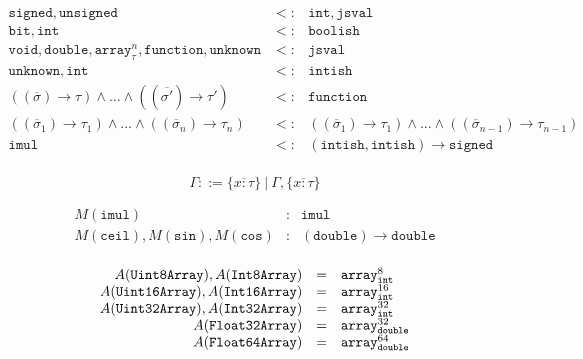 \documentclass{article}
\newcommand{\funty}[2]{({#1}) \rightarrow {#2}}
\newcommand{\seq}[1]{\overline{{#1}}}
\newcommand{\mathjssm}[1]{\mbox{\texttt{\scriptsize {#1}}}}
\newcommand{\bit}{\mathtt{bit}}
\newcommand{\unsigned}{\mathtt{unsigned}}
\newcommand{\intsm}{\mathjssm{int}}
\newcommand{\doublesm}{\mathjssm{double}}
\newcommand{\signed}{\mathtt{signed}}
\newcommand{\double}{\mathtt{double}}
\newcommand{\arr}[2]{\mathtt{array}^{#1}_{#2}}
\newcommand{\jsval}{\mathtt{jsval}}
\newcommand{\unk}{\mathtt{unknown}}
\newcommand{\void}{\mathtt{void}}
\renewcommand{\int}{\mathtt{int}}
\newcommand{\function}{\mathtt{function}}
\newcommand{\boolish}{\mathtt{boolish}}
\newcommand{\imul}{\mathtt{imul}}
\newcommand{\intish}{\mathtt{intish}}
\begin{document}

\[
\begin{array}{rcl}
\signed, \unsigned                                                                  & <: & \int, \jsval \\
\bit, \int                                                                          & <: & \boolish \\
\void, \double, \arr{n}{\tau}, \function, \unk                                      & <: & \jsval \\
\unk, \int                                                                          & <: & \intish \\
(\funty{\seq{\sigma}}{\tau}) \land \ldots \land (\funty{\seq{\sigma'}}{\tau'})      & <: & \function \\
(\funty{\seq{\sigma}_1}{\tau_1}) \land \ldots \land (\funty{\seq{\sigma}_n}{\tau_n}) & <: & (\funty{\seq{\sigma}_1}{\tau_1}) \land \ldots \land (\funty{\seq{\sigma}_{n-1}}{\tau_{n-1}}) \\
\imul                                                                               & <: & \funty{\intish, \intish}{\signed} \\
\end{array}
\]

\[
\Gamma ::= \{ \seq{x : \tau} \} ~|~ \Gamma, \{ \seq{x : \tau} \}
\]

\[
\begin{array}{rcl}
M(\imul) & : & \imul \\
M(\mathtt{ceil}), M(\mathtt{sin}), M(\mathtt{cos}) & : & \funty{\double}{\double} \\
\end{array}
\]

\[
\begin{array}{rcl}
A(\mathtt{Uint8Array}), A(\mathtt{Int8Array})   & = & \arr{8}{\intsm} \\
A(\mathtt{Uint16Array}), A(\mathtt{Int16Array}) & = & \arr{16}{\intsm} \\
A(\mathtt{Uint32Array}), A(\mathtt{Int32Array}) & = & \arr{32}{\intsm} \\
A(\mathtt{Float32Array})                        & = & \arr{32}{\doublesm} \\
A(\mathtt{Float64Array})                        & = & \arr{64}{\doublesm} \\
\end{array}
\]
\end{document}
